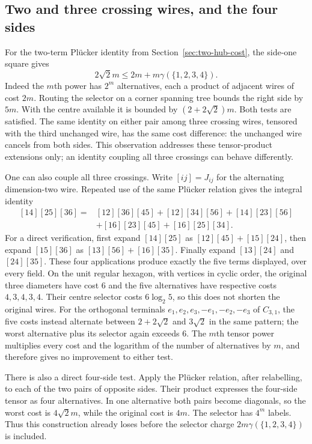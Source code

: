 \subsection{Two and three crossing wires, and the four sides}
For the two-term Pl\"ucker identity from Section~\ref{sec:two-hub-cost}, the side-one square gives
\begin{equation}\label{eq:plucker-price-test}
 2\sqrt2m\leq 2m+m\gamma(\{1,2,3,4\}).
\end{equation}
Indeed the $m$th power has $2^m$ alternatives, each a product of adjacent wires of cost $2m$. Routing the selector on a corner spanning tree bounds the right side by $5m$. With the centre available it is bounded by $(2+2\sqrt2)m$. Both tests are satisfied. The same identity on either pair among three crossing wires, tensored with the third unchanged wire, has the same cost difference: the unchanged wire cancels from both sides. This observation addresses these tensor-product extensions only; an identity coupling all three crossings can behave differently.

One can also couple all three crossings. Write $[ij]=J_{ij}$ for the alternating dimension-two wire. Repeated use of the same Pl\"ucker relation gives the integral identity
\begin{align}\label{eq:three-crossings}
 [14][25][36]={}&[12][36][45]+[12][34][56]+[14][23][56]\nonumber\\
 &+[16][23][45]+[16][25][34].
\end{align}
For a direct verification, first expand $[14][25]$ as $[12][45]+[15][24]$, then expand $[15][36]$ as $[13][56]+[16][35]$. Finally expand $[13][24]$ and $[24][35]$. These four applications produce exactly the five terms displayed, over every field. On the unit regular hexagon, with vertices in cyclic order, the original three diameters have cost $6$ and the five alternatives have respective costs $4,3,4,3,4$. Their centre selector costs $6\log_2 5$, so this does not shorten the original wires. For the orthogonal terminals $e_1,e_2,e_3,-e_1,-e_2,-e_3$ of $C_{3,1}$, the five costs instead alternate between $2+2\sqrt2$ and $3\sqrt2$ in the same pattern; the worst alternative plus its selector again exceeds $6$. The $m$th tensor power multiplies every cost and the logarithm of the number of alternatives by $m$, and therefore gives no improvement to either test.

There is also a direct four-side test. Apply the Pl\"ucker relation, after relabelling, to each of the two pairs of opposite sides. Their product expresses the four-side tensor as four alternatives. In one alternative both pairs become diagonals, so the worst cost is $4\sqrt2m$, while the original cost is $4m$. The selector has $4^m$ labels. Thus this construction already loses before the selector charge $2m\gamma(\{1,2,3,4\})$ is included.

